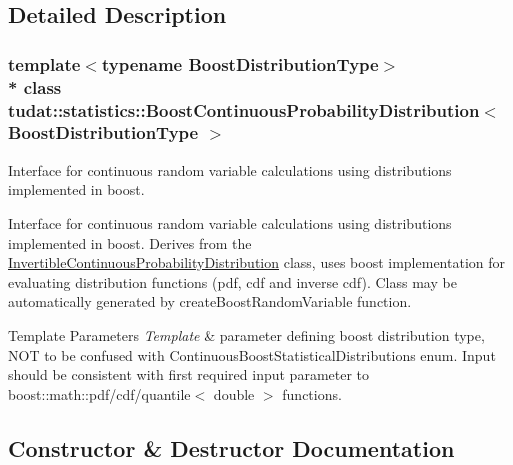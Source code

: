 \subsection{Detailed Description}
\subsubsection*{template$<$typename Boost\+Distribution\+Type$>$\\*
class tudat\+::statistics\+::\+Boost\+Continuous\+Probability\+Distribution$<$ Boost\+Distribution\+Type $>$}

Interface for continuous random variable calculations using distributions implemented in boost. 

Interface for continuous random variable calculations using distributions implemented in boost. Derives from the \hyperlink{classtudat_1_1statistics_1_1InvertibleContinuousProbabilityDistribution}{Invertible\+Continuous\+Probability\+Distribution} class, uses boost implementation for evaluating distribution functions (pdf, cdf and inverse cdf). Class may be automatically generated by create\+Boost\+Random\+Variable function. 
\begin{DoxyTemplParams}{Template Parameters}
{\em Template} & parameter defining boost distribution type, N\+OT to be confused with Continuous\+Boost\+Statistical\+Distributions enum. Input should be consistent with first required input parameter to boost\+::math\+::pdf/cdf/quantile$<$ double $>$ functions. \\
\hline
\end{DoxyTemplParams}


\subsection{Constructor \& Destructor Documentation}
